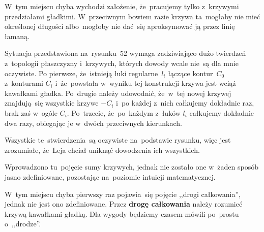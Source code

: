\documentclass[a4paper,11pt]{article}
\begin{document}
\vspace{\spaceFour}


\start {} W~tym miejscu chyba wychodzi założenie, że~pracujemy
tylko z~krzywymi przedziałami gładkimi. W~przeciwnym bowiem razie
krzywa ta~mogłaby nie mieć określonej długości albo~mogłoby nie
dać~się aproksymować ją przez linię łamaną.

\vspace{\spaceFour}


\start {} Sytuacja przedstawiona na~rysunku~52 wymaga
zadziwiająco dużo twierdzeń z~topologii płaszczyzny i~krzywych,
których dowody wcale nie~są dla mnie oczywiste. Po pierwsze,
że~istnieją łuki regularne~$l_{ i }$ łączące kontur~$C_{ 0 }$
z~konturami $C_{ i }$ i~że~powstała w~wyniku tej konstrukcji krzywa
jest wciąż kawałkami gładka. Po~drugie należy udowodnić, że~w~tej
nowej krzywej znajdują~się wszystkie krzywe $-C_{ i }$ i~po każdej
z~nich całkujemy dokładnie raz, brak zaś w~ogóle $C_{ i }$.
Po~trzecie, że~po~każdym z~łuków $l_{ i }$ całkujemy dokładnie dwa
razy, obiegając je w~dwóch przeciwnych kierunkach.

Wszystkie te~stwierdzenia~są oczywiste na~podstawie rysunku, więc jest
zrozumiałe, że~Leja chciał uniknąć dowodzenia ich wszystkich.

\vspace{\spaceFour}


\start {} Wprowadzono tu~pojęcie sumy krzywych, jednak nie
zostało one w~żaden sposób jasno zdefiniowane, pozostając na~poziomie
intuicji matematycznej.

\vspace{\spaceFour}


\start {} W~tym miejscu chyba pierwszy raz pojawia~się pojęcie
,,drogi całkowania'', jednak nie jest ono zdefiniowane. Przez
\textbf{drogę całkowania} należy rozumieć krzywą kawałkami gładką. Dla
wygody będziemy czasem mówili po~prostu o~,,drodze''.

\vspace{\spaceFour}
\end{document}
